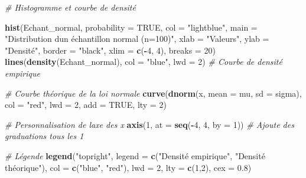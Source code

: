 \documentclass[
  12pt,
]{article}
\newenvironment{Shaded}{\begin{snugshade}}{\end{snugshade}}
\newcommand{\AttributeTok}[1]{\textcolor[rgb]{0.13,0.29,0.53}{#1}}
\newcommand{\CommentTok}[1]{\textcolor[rgb]{0.56,0.35,0.01}{\textit{#1}}}
\newcommand{\ConstantTok}[1]{\textcolor[rgb]{0.56,0.35,0.01}{#1}}
\newcommand{\DecValTok}[1]{\textcolor[rgb]{0.00,0.00,0.81}{#1}}
\newcommand{\FloatTok}[1]{\textcolor[rgb]{0.00,0.00,0.81}{#1}}
\newcommand{\FunctionTok}[1]{\textcolor[rgb]{0.13,0.29,0.53}{\textbf{#1}}}
\newcommand{\NormalTok}[1]{#1}
\newcommand{\SpecialCharTok}[1]{\textcolor[rgb]{0.81,0.36,0.00}{\textbf{#1}}}
\newcommand{\StringTok}[1]{\textcolor[rgb]{0.31,0.60,0.02}{#1}}
\begin{document}
\begin{Shaded}
\begin{Highlighting}[]
\CommentTok{\# Histogramme et courbe de densité}

\FunctionTok{hist}\NormalTok{(Echant\_normal, }\AttributeTok{probability =} \ConstantTok{TRUE}\NormalTok{, }\AttributeTok{col =} \StringTok{"lightblue"}\NormalTok{, }
     \AttributeTok{main =} \StringTok{"Distribution d\textquotesingle{}un échantillon normal (n=100)"}\NormalTok{,}
     \AttributeTok{xlab =} \StringTok{"Valeurs"}\NormalTok{, }\AttributeTok{ylab =} \StringTok{"Densité"}\NormalTok{, }\AttributeTok{border =} \StringTok{"black"}\NormalTok{,}
     \AttributeTok{xlim =} \FunctionTok{c}\NormalTok{(}\SpecialCharTok{{-}}\DecValTok{4}\NormalTok{, }\DecValTok{4}\NormalTok{), }\AttributeTok{breaks =} \DecValTok{20}\NormalTok{)  }
\FunctionTok{lines}\NormalTok{(}\FunctionTok{density}\NormalTok{(Echant\_normal), }\AttributeTok{col =} \StringTok{"blue"}\NormalTok{, }\AttributeTok{lwd =} \DecValTok{2}\NormalTok{) }\CommentTok{\# Courbe de densité empirique}

\CommentTok{\# Courbe théorique de la loi normale}
\FunctionTok{curve}\NormalTok{(}\FunctionTok{dnorm}\NormalTok{(x, }\AttributeTok{mean =}\NormalTok{ mu, }\AttributeTok{sd =}\NormalTok{ sigma), }\AttributeTok{col =} \StringTok{"red"}\NormalTok{, }\AttributeTok{lwd =} \DecValTok{2}\NormalTok{, }\AttributeTok{add =} \ConstantTok{TRUE}\NormalTok{, }\AttributeTok{lty =} \DecValTok{2}\NormalTok{)}

\CommentTok{\# Personnalisation de l\textquotesingle{}axe des x}
\FunctionTok{axis}\NormalTok{(}\DecValTok{1}\NormalTok{, }\AttributeTok{at =} \FunctionTok{seq}\NormalTok{(}\SpecialCharTok{{-}}\DecValTok{4}\NormalTok{, }\DecValTok{4}\NormalTok{, }\AttributeTok{by =} \DecValTok{1}\NormalTok{))  }\CommentTok{\# Ajoute des graduations tous les 1}

\CommentTok{\# Légende}
\FunctionTok{legend}\NormalTok{(}\StringTok{"topright"}\NormalTok{, }\AttributeTok{legend =} \FunctionTok{c}\NormalTok{(}\StringTok{"Densité empirique"}\NormalTok{, }\StringTok{"Densité théorique"}\NormalTok{), }
       \AttributeTok{col =} \FunctionTok{c}\NormalTok{(}\StringTok{"blue"}\NormalTok{, }\StringTok{"red"}\NormalTok{), }\AttributeTok{lwd =} \DecValTok{2}\NormalTok{, }\AttributeTok{lty =} \FunctionTok{c}\NormalTok{(}\DecValTok{1}\NormalTok{,}\DecValTok{2}\NormalTok{), }\AttributeTok{cex =} \FloatTok{0.8}\NormalTok{)}
\end{Highlighting}
\end{Shaded}
\end{document}
